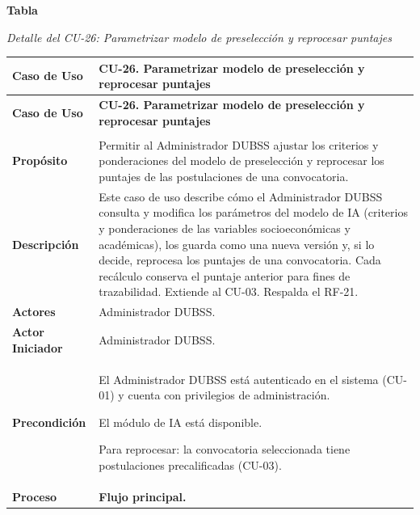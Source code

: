 \label{tab:detalle_cu26}
\noindent\textbf{Tabla~\thetable}\par\nopagebreak
\noindent\textit{Detalle del CU-26: Parametrizar modelo de preselección y reprocesar puntajes}\par\nopagebreak
\begingroup\small\linespread{1}\selectfont
\begin{longtable}{>{\raggedright\arraybackslash}p{2.9cm} >{\raggedright\arraybackslash}p{12.6cm}}
\toprule
\textbf{Caso de Uso} & \textbf{CU-26. Parametrizar modelo de preselección y reprocesar puntajes} \\
\midrule
\endfirsthead
\toprule
\textbf{Caso de Uso} & \textbf{CU-26. Parametrizar modelo de preselección y reprocesar puntajes} \\
\midrule
\endhead
\endfoot
\bottomrule
\multicolumn{2}{l}{\textit{Nota.} Elaboración propia.} \\
\endlastfoot
\textbf{Propósito} & Permitir al Administrador DUBSS ajustar los criterios y ponderaciones del modelo de preselección y reprocesar los puntajes de las postulaciones de una convocatoria. \\
\midrule
\textbf{Descripción} & Este caso de uso describe cómo el Administrador DUBSS consulta y modifica los parámetros del modelo de IA (criterios y ponderaciones de las variables socioeconómicas y académicas), los guarda como una nueva versión y, si lo decide, reprocesa los puntajes de una convocatoria. Cada recálculo conserva el puntaje anterior para fines de trazabilidad. Extiende al CU-03. Respalda el RF-21. \\
\midrule
\textbf{Actores} & Administrador DUBSS. \\
\midrule
\textbf{Actor Iniciador} & Administrador DUBSS. \\
\midrule
\textbf{Precondición} & \vspace{-\baselineskip}\begin{cuvin}
    \item El Administrador DUBSS está autenticado en el sistema (CU-01) y cuenta con privilegios de administración.
    \item El módulo de IA está disponible.
    \item Para reprocesar: la convocatoria seleccionada tiene postulaciones precalificadas (CU-03).
\end{cuvin} \\
\midrule
\textbf{Proceso} & \textbf{Flujo principal.}

\end{longtable}
